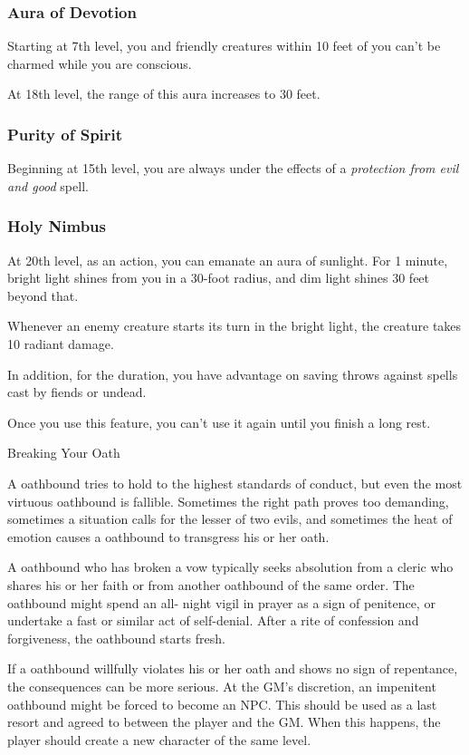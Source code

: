 \subsubsection{Aura of Devotion}

Starting at 7th level, you and friendly creatures within 10 feet of you can't be charmed while you are conscious.

At 18th level, the range of this aura increases to 30 feet.

\subsubsection{Purity of Spirit}

Beginning at 15th level, you are always under the effects of a \textit{protection from evil and good} spell.

\subsubsection{Holy Nimbus}

At 20th level, as an action, you can emanate an aura of sunlight. For 1 minute, bright light shines from you in a 30-foot radius, and dim light shines 30 feet beyond that.

Whenever an enemy creature starts its turn in the bright light, the creature takes 10 radiant damage.

In addition, for the duration, you have advantage on saving throws against spells cast by fiends or undead.

Once you use this feature, you can't use it again until you finish a long rest.

\begin{DndComment}{Breaking Your Oath}

A oathbound tries to hold to the highest standards of conduct, but even the most virtuous oathbound is fallible. Sometimes the right path proves too demanding, sometimes a situation calls for the lesser of two evils, and sometimes the heat of emotion causes a oathbound to transgress his or her oath.

A oathbound who has broken a vow typically seeks absolution from a cleric who shares his or her faith or from another oathbound of the same order. The oathbound might spend an all- night vigil in prayer as a sign of penitence, or undertake a fast or similar act of self-denial. After a rite of confession and forgiveness, the oathbound starts fresh.

If a oathbound willfully violates his or her oath and shows no sign of repentance, the consequences can be more serious. At the GM's discretion, an impenitent oathbound might be forced to become an NPC. This should be used as a last resort and agreed to between the player and the GM. When this happens, the player should create a new character of the same level.
\end{DndComment}

